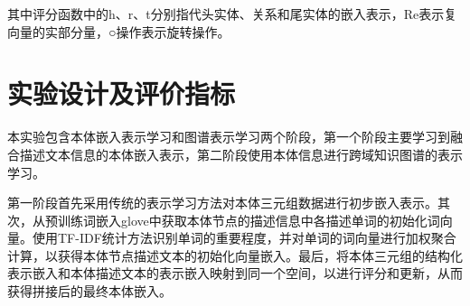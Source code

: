 
其中评分函数中的h、r、t分别指代头实体、关系和尾实体的嵌入表示，Re表示复向量的实部分量，○操作表示旋转操作。

\section{实验设计及评价指标}
本实验包含本体嵌入表示学习和图谱表示学习两个阶段，第一个阶段主要学习到融合描述文本信息的本体嵌入表示，第二阶段使用本体信息进行跨域知识图谱的表示学习。

第一阶段首先采用传统的表示学习方法对本体三元组数据进行初步嵌入表示。其次，从预训练词嵌入glove中获取本体节点的描述信息中各描述单词的初始化词向量。使用TF-IDF统计方法识别单词的重要程度，并对单词的词向量进行加权聚合计算，以获得本体节点描述文本的初始化向量嵌入。最后，将本体三元组的结构化表示嵌入和本体描述文本的表示嵌入映射到同一个空间，以进行评分和更新，从而获得拼接后的最终本体嵌入。

